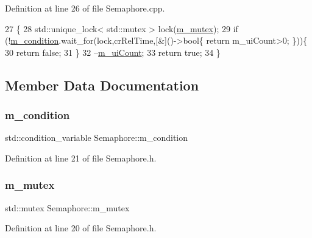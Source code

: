 Definition at line 26 of file Semaphore.\+cpp.


\begin{DoxyCode}
27 \{
28       std::unique\_lock< std::mutex > lock(\hyperlink{classSemaphore_a6490f302f311da3ce373a81672673296}{m\_mutex});
29       \textcolor{keywordflow}{if} (!\hyperlink{classSemaphore_a2b04d3a53f1fc1a13d7ed5d19d9e2be9}{m\_condition}.wait\_for(lock,crRelTime,[&]()->bool\{ return m\_uiCount>0; \}))\{
30       \textcolor{keywordflow}{return} \textcolor{keyword}{false};
31       \}
32       --\hyperlink{classSemaphore_a1456f105008b0c309f41211afbdd5fee}{m\_uiCount};
33       \textcolor{keywordflow}{return} \textcolor{keyword}{true};
34 \}
\end{DoxyCode}


\subsection{Member Data Documentation}
\mbox{\label{classSemaphore_a2b04d3a53f1fc1a13d7ed5d19d9e2be9}} 
\subsubsection{\texorpdfstring{m\+\_\+condition}{m\_condition}}
{\footnotesize\ttfamily std\+::condition\+\_\+variable Semaphore\+::m\+\_\+condition\hspace{0.3cm}{\ttfamily [private]}}



Definition at line 21 of file Semaphore.\+h.

\mbox{\label{classSemaphore_a6490f302f311da3ce373a81672673296}} 
\subsubsection{\texorpdfstring{m\+\_\+mutex}{m\_mutex}}
{\footnotesize\ttfamily std\+::mutex Semaphore\+::m\+\_\+mutex\hspace{0.3cm}{\ttfamily [private]}}



Definition at line 20 of file Semaphore.\+h.

\mbox{\label{classSemaphore_a1456f105008b0c309f41211afbdd5fee}} 
